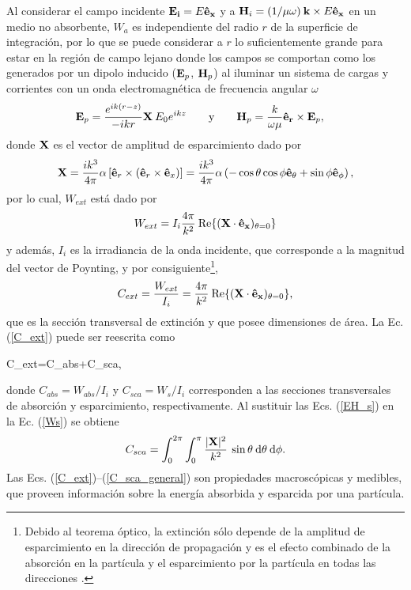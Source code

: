 Al considerar el campo incidente $\vb{E_i}=E\vb{\hat{e}_x}$ y a $\vb{H}_i=(1/\mu \omega)\: \vb{k} \times E \vb{\hat{e}_x}$ en un medio no absorbente, $W_a$ es independiente del radio $r$ de la superficie de integración, por lo que se puede considerar a $r$ lo suficientemente grande para estar en la región de campo lejano donde los campos se comportan como los generados por un dipolo inducido ($\vb{E}_p$, $\vb{H}_p$) al iluminar un sistema de cargas y corrientes con un onda electromagnética de frecuencia angular $\omega$ \cite{bohrenAbsorptionScatteringLight2008}
%
\begin{align}
	\vb{E}_{p}&=\frac{e^{ik(r-z)}}{-ikr}\vb{X}\:E_0 e^{ikz}\qquad\text{y}\qquad
	\vb{H}_{p}=\frac{k}{\omega\mu}\vb{\hat{e}_r}\times\vb{E}_{p},
	\label{EH_s}
\end{align}
%
donde $\vb{X}$ es el vector de amplitud de esparcimiento dado por
\begin{equation}
	\vb{X}=\frac{ik^3}{4\pi}\alpha \left[ \vb{\hat{e}}_r\times(\vb{\hat{e}}_r\times \vb{\hat{e}}_x)\right]=\frac{ik^3}{4\pi}\alpha \left(-\cos\theta\cos\phi \vb{\hat{e}}_{\theta}+\sin\phi \vb{\hat{e}}_{\phi} \right),
	\label{eq:Xvec}
\end{equation}
%
por lo cual, $W_{ext}$ está dado por \cite{bohrenAbsorptionScatteringLight2008}
%
\begin{equation*}
	W_{ext}=I_i\frac{4\pi}{k^2}\:\text{Re}\{(\vb{X}\cdot\vb{\hat{e}_x})_{\theta=0}\}
\end{equation*}
%
y además, $I_i$ es la irradiancia de la onda incidente, que corresponde a la magnitud del vector de Poynting, y por consiguiente\footnote{Debido al teorema óptico, la extinción sólo depende de la amplitud de esparcimiento en la dirección de propagación y es el efecto combinado de la absorción en la partícula y el esparcimiento por la partícula en todas las direcciones \cite{bohrenAbsorptionScatteringLight2008}.},
%
\begin{equation}
	C_{ext}=\frac{W_{ext}}{I_i}=\frac{4\pi}{k^2}\:\text{Re}\{(\vb{X}\cdot\vb{\hat{e}_x})_{\theta=0}\}, \label{C_ext}
\end{equation}
%
que es la sección transversal de extinción y que posee dimensiones de área. La Ec. (\ref{C_ext}) puede ser reescrita como \cite{bohrenAbsorptionScatteringLight2008}
%
\begin{tcolorbox}
	C_{ext}=C_{abs}+C_{sca},
	\label{C} 
\end{tcolorbox}
%
\noindent donde $C_{abs}=W_{abs}/I_i$ y $C_{sca}=W_s/I_i$ corresponden a las secciones transversales de absorción y esparcimiento, respectivamente. Al sustituir las Ecs. (\ref{EH_s}) en la Ec. (\ref{Ws}) se obtiene
%
\begin{equation}
	C_{sca}=\int_0^{2\pi}\int_0^{\pi}\frac{|\vb{X}|^2}{k^2}\:\sin\theta\: \text{d}\theta\:\text{d}\phi.
	\label{C_sca_general}
\end{equation}
Las Ecs. (\ref{C_ext})--(\ref{C_sca_general}) son propiedades macroscópicas y medibles, que proveen información sobre la energía absorbida y esparcida por una partícula.  \\

